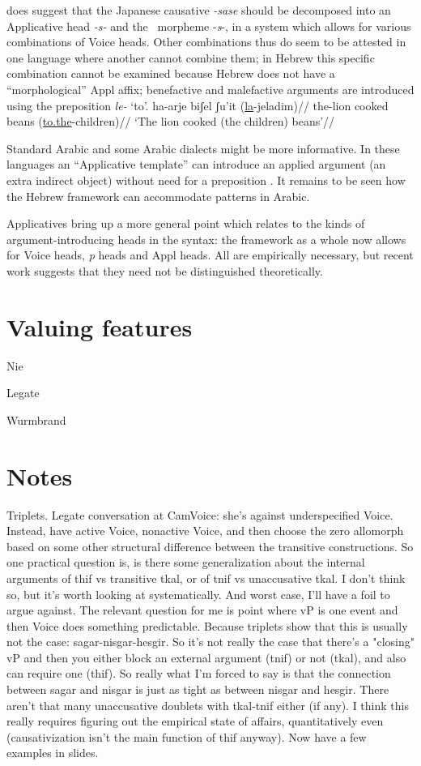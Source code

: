 \cite{oseki16nyu} does suggest that the Japanese causative \emph{-sase} should be decomposed into an Applicative head \emph{-s-} and the \vd~morpheme -\emph{s}-{, in a system which allows for various combinations of Voice heads}. Other combinations thus do seem to be attested in one language where another cannot combine them; in Hebrew this {specific }combination cannot be examined because Hebrew does not have a ``morphological'' Appl affix; benefactive and malefactive arguments are introduced using the preposition \emph{le-} `to'.
\ex \begingl
    \gla ha-arje biʃel ʃu'it (\underline{la}-jeladim)//
    \glb the-lion cooked beans (\underline{to.the}-children)//
    \glft `The lion cooked (the children) beans'//
    \endgl
\xe

Standard Arabic and some Arabic dialects might be more informative. In these languages an ``Applicative template'' can introduce an applied argument (an extra indirect object) without need for a preposition \citep{alkaabi12}. It remains to be seen how the Hebrew framework can accommodate patterns in Arabic.

Applicatives bring up a more general point which relates to the kinds of argument-introducing heads in the syntax: the framework as a whole now allows for Voice heads, \emph{p} heads and Appl heads. All are empirically necessary, but recent work suggests that they need not be distinguished theoretically.

\section{Valuing features} \label{i:nie}
Nie

Legate

Wurmbrand

\section{Notes}
Triplets.
Legate conversation at CamVoice: she's against underspecified Voice. Instead, have active Voice, nonactive Voice, and then choose the zero allomorph based on some other structural difference between the transitive constructions. So one practical question is, is there some generalization about the internal arguments of thif vs transitive tkal, or of tnif vs unaccusative tkal.
	I don't think so, but it's worth looking at systematically. And worst case, I'll have a foil to argue against.
	The relevant question for me is point where vP is one event and then Voice does something predictable. Because triplets show that this is usually not the case: sagar-nisgar-hesgir. So it's not really the case that there's a "closing" vP and then you either block an external argument (tnif) or not (tkal), and also can require one (thif).
	So really what I'm forced to say is that the connection between sagar and nisgar is just as tight as between nisgar and hesgir.
	There aren't that many unaccusative doublets with tkal-tnif either (if any).
	I think this really requires figuring out the empirical state of affairs, quantitatively even (causativization isn't the main function of thif anyway).
	Now have a few examples in slides.

